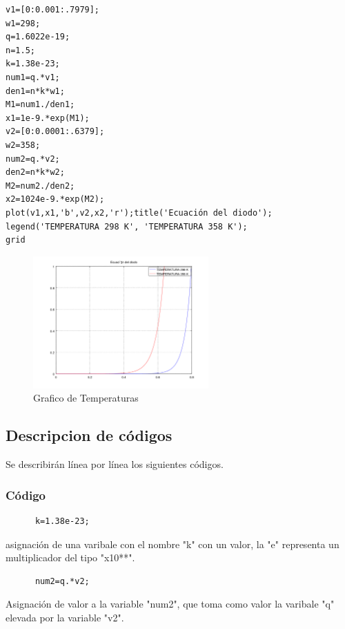 \documentclass[]{article}
\begin{document}
 \begin{verbatim}
v1=[0:0.001:.7979];
w1=298;
q=1.6022e-19;
n=1.5;
k=1.38e-23;
num1=q.*v1;
den1=n*k*w1;
M1=num1./den1;
x1=1e-9.*exp(M1);
v2=[0:0.0001:.6379];
w2=358;
num2=q.*v2;
den2=n*k*w2;
M2=num2./den2;
x2=1024e-9.*exp(M2);
plot(v1,x1,'b',v2,x2,'r');title('Ecuación del diodo'); 
legend('TEMPERATURA 298 K', 'TEMPERATURA 358 K');
grid 
 \end{verbatim}
 
 \begin{figure}[h!]
 	\centering
 	\includegraphics[width=0.6\textwidth]{codigo1.png}
 	\caption{Grafico de Temperaturas}
 	\label{fig:codigo1}
 \end{figure}

\subsection{Descripcion de códigos}

Se describirán línea por línea los siguientes códigos.\\

\subsubsection{Código}

	  \begin{verbatim}
	  k=1.38e-23;
	  \end{verbatim}
	  
	  asignación de una varibale con el nombre "k" con un valor, la "e" representa un multiplicador del tipo "x10**".\\
	  
	  \begin{verbatim}
	  num2=q.*v2;
	   \end{verbatim}
	   
	   Asignación de valor a la variable "num2", que toma como valor la varibale "q" elevada por la variable "v2".\\
	   
\end{document}
